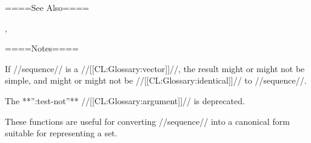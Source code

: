====See Also====

{\secref\ConstantModification},

{\secref\TraversalRules}

====Notes====

If //sequence// is a //[[CL:Glossary:vector]]//, the result might or might not be simple, and might or might not be //[[CL:Glossary:identical]]// to //sequence//.

The **'':test-not''** //[[CL:Glossary:argument]]// is deprecated.

These functions are useful for converting //sequence// into a canonical form suitable for representing a set.

     
